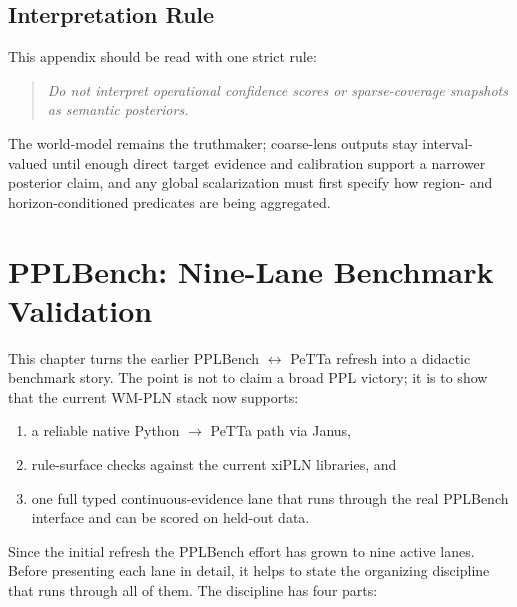 \documentclass[11pt,openany]{report}
\begin{document}
\section{Interpretation Rule}

This appendix should be read with one strict rule:
\begin{quote}
\emph{Do not interpret operational confidence scores or sparse-coverage
snapshots as semantic posteriors.}
\end{quote}
The world-model remains the truthmaker; coarse-lens outputs stay
interval-valued until enough direct target evidence and calibration
support a narrower posterior claim, and any global scalarization must
first specify how region- and horizon-conditioned predicates are being
aggregated.


\chapter{PPLBench: Nine-Lane Benchmark Validation}
\label{app:pplbench-petta-refresh}
\label{ch:pplbench}

This chapter turns the earlier PPLBench $\leftrightarrow$ PeTTa refresh
into a didactic benchmark story.  The point is not to claim a broad
PPL victory; it is to show that the current WM-PLN stack now supports:
\begin{enumerate}
\item a reliable native Python $\to$ PeTTa path via Janus,
\item rule-surface checks against the current xiPLN libraries, and
\item one full typed continuous-evidence lane that runs through the real
PPLBench interface and can be scored on held-out data.
\end{enumerate}

\noindent
Since the initial refresh the PPLBench effort has grown to nine active lanes.
Before presenting each lane in detail, it helps to state the organizing
discipline that runs through all of them.  The discipline has four parts:
\end{document}
